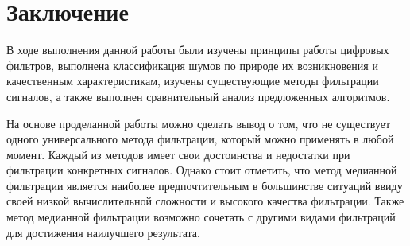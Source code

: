 \chapter*{Заключение}

В ходе выполнения данной работы были изучены принципы работы цифровых фильтров, выполнена классификация шумов по природе их возникновения и качественным характеристикам, изучены существующие методы фильтрации сигналов, а также выполнен сравнительный анализ предложенных алгоритмов.

На основе проделанной работы можно сделать вывод о том, что не существует одного универсального метода фильтрации, который можно применять в любой момент. Каждый из методов имеет свои достоинства и недостатки при фильтрации конкретных сигналов. Однако стоит отметить, что метод медианной фильтрации является наиболее предпочтительным в большинстве ситуаций ввиду своей низкой вычислительной сложности и высокого качества фильтрации. Также метод медианной фильтрации возможно сочетать с другими видами фильтраций для достижения наилучшего результата.	
